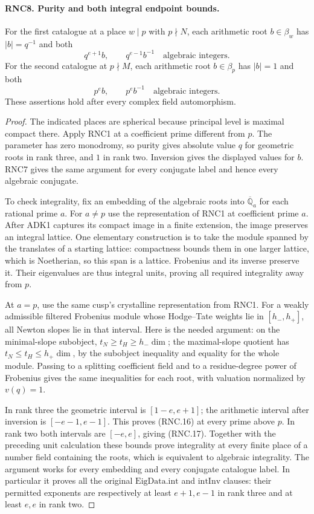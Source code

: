 \paragraph{RNC8. Purity and both integral endpoint bounds.}
\label{claim:RNC8}
For the first catalogue at a place $w\mid p$ with
$p\nmid N$, each arithmetic root $b\in\beta_w$ has
$|b|=q^{-1}$ and both
\[
          q^{e+1}b,\qquad q^{e-1}b^{-1}
                       \quad\text{algebraic integers}.       \tag{RNC.16}
\]
For the second catalogue at $p\nmid M$, each arithmetic
root $b\in\beta_p$ has $|b|=1$ and both
\[
                    p^e b,\qquad p^e b^{-1}
                       \quad\text{algebraic integers}.       \tag{RNC.17}
\]
These assertions hold after every complex field automorphism.
\begin{proof}
The indicated places are spherical because principal level
is maximal compact there.  Apply RNC1 at a coefficient
prime different from $p$.  The parameter has zero monodromy,
so purity gives absolute value $q$ for geometric roots in
rank three, and $1$ in rank two.  Inversion gives the
displayed values for $b$.  RNC7 gives the same argument for
every conjugate label and hence every algebraic conjugate.

To check integrality, fix an embedding of the algebraic
roots into $\overline{\mathbb Q}_a$ for each rational prime
$a$.  For $a\ne p$ use the representation of RNC1 at
coefficient prime $a$.  After ADK1 captures its compact
image in a finite extension, the image preserves an
integral lattice.  One elementary construction is to take
the module spanned by the translates of a starting lattice:
compactness bounds them in one larger lattice, which is
Noetherian, so this span is a lattice.  Frobenius and its
inverse preserve it.  Their eigenvalues are thus integral
units, proving all required integrality away from $p$.

At $a=p$, use the same cusp's crystalline representation
from RNC1.  For a weakly admissible filtered Frobenius
module whose Hodge--Tate weights lie in $[h_-,h_+]$, all
Newton slopes lie in that interval.  Here is the needed
argument: on the minimal-slope subobject,
$t_N\geq t_H\geq h_-\dim$; the maximal-slope quotient has
$t_N\leq t_H\leq h_+\dim$, by the subobject inequality
and equality for the whole module.  Passing to a splitting
coefficient field and to a residue-degree power of Frobenius
gives the same inequalities for each root, with valuation
normalized by $v(q)=1$.

In rank three the geometric interval is $[1-e,e+1]$;
the arithmetic interval after inversion is
$[-e-1,e-1]$.  This proves (RNC.16) at every prime above
$p$.  In rank two both intervals are $[-e,e]$, giving
(RNC.17).  Together with the preceding unit calculation
these bounds prove integrality at every finite place of
a number field containing the roots, which is equivalent
to algebraic integrality.  The argument works for every
embedding and every conjugate catalogue label.  In
particular it proves all the original $\mathrm{EigData.int}$
and $\mathrm{intInv}$ clauses: their permitted exponents
are respectively at least $e+1,e-1$ in rank three and
at least $e,e$ in rank two.
\end{proof}


